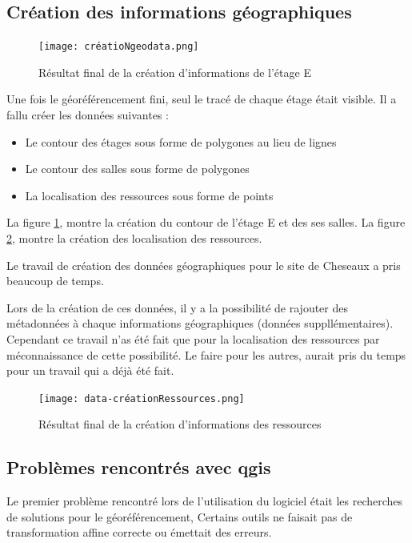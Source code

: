\documentclass[
    iai, %
    il, %
]{heig-tb}
\begin{document}
\subsection{Création des informations géographiques}

\begin{figure}[h]
    \centering
    \texttt{[image: créatioNgeodata.png]}
    \caption{Résultat final de la création d'informations de l'étage E}
    \label{fig:polygones}
\end{figure}

Une fois le géoréférencement fini, seul le tracé de chaque étage était visible.
Il a fallu créer les données suivantes :

\begin{itemize}
    \item Le contour des étages sous forme de polygones au lieu de lignes
    \item Le contour des salles sous forme de polygones
    \item La localisation des ressources sous forme de points
\end{itemize}

La figure \ref{fig:polygones}, montre la création du contour de l'étage E et des ses salles.
La figure \ref{fig:ressources}, montre la création des localisation des ressources.

Le travail de création des données géographiques pour le site de Cheseaux a pris beaucoup de temps.

Lors de la création de ces données, il y a la possibilité de rajouter des métadonnées à chaque informations géographiques
(données suppllémentaires). Cependant ce travail n'as été fait que pour la localisation des ressources par méconnaissance de cette possibilité.
Le faire pour les autres, aurait pris du temps pour un travail qui a déjà été fait.


\begin{figure}[h]
    \centering
    \texttt{[image: data-créationRessources.png]}
    \caption{Résultat final de la création d'informations des ressources}
    \label{fig:ressources}
\end{figure}

\subsection{Problèmes rencontrés avec \gls{qgis}}
Le premier problème rencontré lors de l'utilisation du logiciel était les recherches de solutions pour le géoréférencement,
Certains outils ne faisait pas de transformation affine correcte ou émettait des erreurs.
\end{document}
